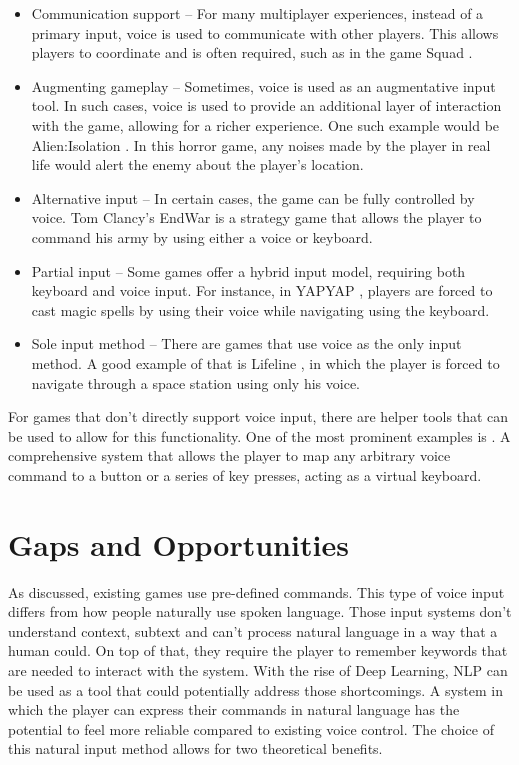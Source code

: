 \begin{itemize}

    \item Communication support -- For many multiplayer experiences, instead of a primary input, voice is used to communicate with other players. This allows players to coordinate and is often required, such as in the game Squad \parencite{offworldSquad2020}.
    \item Augmenting gameplay -- Sometimes, voice is used as an augmentative input tool. In such cases, voice is used to provide an additional layer of interaction with the game, allowing for a richer experience.
    One such example would be Alien:Isolation \parencite{interactiveAlienIsolation2014}. In this horror game, any noises made by the player in real life would alert the enemy about the player's location. 
    \item Alternative input -- In certain cases, the game can be fully controlled by voice. Tom Clancy’s EndWar \parencite{ubisoftshanghaiTomClancysEndWar2008} is a strategy game that allows the player to command his army by using either a voice or keyboard. 
    \item Partial input -- Some games offer a hybrid input model, requiring both keyboard and voice input. For instance, in YAPYAP \parencite{maisonbapYAPYAP2026}, players are forced to cast magic spells by using their voice while navigating using the keyboard.
    \item Sole input method -- There are games that use voice as the only input method. A good example of that is Lifeline \parencite{sonycomputerentertainmentjapanLifeline2003}, in which the player is forced to navigate through a space station using only his voice. 
\end{itemize}

For games that don't directly support voice input, there are helper tools that can be used to allow for this functionality. One of the most prominent examples is \textcite{Talon2017}. A comprehensive system that allows the player to map any arbitrary voice command to a button or a series of key presses, acting as a virtual keyboard. 


\section{Gaps and Opportunities}

As discussed, existing games use pre-defined commands.
This type of voice input differs from how people naturally use spoken language. Those input systems don't understand context, subtext and can't process natural language in a way that a human could. On top of that, they require the player to remember keywords that are needed to interact with the system. 
With the rise of Deep Learning, NLP can be used as a tool that could potentially address those shortcomings. A system in which the player can express their commands in natural language has the potential to feel more reliable compared to existing voice control. 
The choice of this natural input method allows for two theoretical benefits. 

